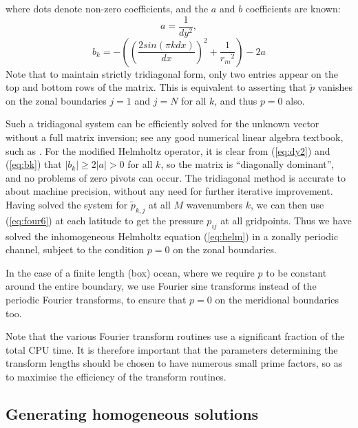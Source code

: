 \documentclass[11pt, a4paper,twoside]{article}
\newcommand{\rdm}[0]{{r_m}}
\numberwithin{equation}{section}
\begin{document}
where dots denote non-zero coefficients, and the $a$ and $b$ coefficients are known:
\begin{equation}\label{eq:dy2}
a = \frac{1}{dy^2},
\end{equation}
\begin{equation}\label{eq:bk}
 b_k = - \left( \left( \frac{2 sin(\pi k dx)}{dx} \right)^2 + \frac{1}{\rdm^2}\right) - 2a
\end{equation}
Note that to maintain strictly tridiagonal form, only two entries appear on the top and bottom rows of the matrix.
This is equivalent to asserting that $\tilde{p}$ vanishes on the zonal boundaries $j=1$ and $j=N$ for all $k$, and thus $p=0$ also.

Such a tridiagonal system can be efficiently solved for the unknown vector without a full matrix inversion; see any good numerical linear algebra textbook, such as \citet{press:92}.
For the modified Helmholtz operator, it is clear from (\ref{eq:dy2}) and (\ref{eq:bk}) that $|b_k| \ge 2|a| > 0$ for all $k$, so the matrix is ``diagonally dominant'', and no problems of zero pivots can occur.
The tridiagonal method is accurate to about machine precision, without any need for further iterative improvement. 
Having solved the system for $\tilde{p}_{k,j}$ at all $M$ wavenumbers $k$, we can then use (\ref{eq:four6}) at each latitude to get the pressure $p_{ij}$ at all gridpoints.
Thus we have solved the inhomogeneous Helmholtz equation (\ref{eq:helm}) in a zonally periodic channel, subject to the condition $p = 0$ on the zonal boundaries.

In the case of a finite length (box) ocean, where we require $p$ to be constant around the entire boundary, we use Fourier sine transforms instead of the periodic Fourier transforms, to ensure that $p = 0$ on the meridional boundaries too.

Note that the various Fourier transform routines use a significant fraction of the total CPU time.
It is therefore important that the parameters determining the transform lengths should be chosen to have numerous small prime factors, so as to maximise the efficiency of the transform routines.

\subsection{Generating homogeneous solutions}
\end{document}

